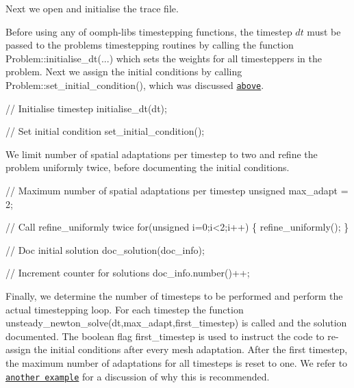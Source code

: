 Next we open and initialise the trace file.




Before using any of {\ttfamily oomph-\/lib\textquotesingle{}s} timestepping functions, the timestep $ dt $ must be passed to the problem\textquotesingle{}s timestepping routines by calling the function {\ttfamily Problem\+::initialise\+\_\+dt}(...) which sets the weights for all timesteppers in the problem. Next we assign the initial conditions by calling {\ttfamily Problem\+::set\+\_\+initial\+\_\+condition()}, which was discussed \href{#set_initial_condition}{\tt above}.


\begin{DoxyCodeInclude}
 \textcolor{comment}{// Initialise timestep}
 initialise\_dt(dt);

 \textcolor{comment}{// Set initial condition}
 set\_initial\_condition();

\end{DoxyCodeInclude}


We limit number of spatial adaptations per timestep to two and refine the problem uniformly twice, before documenting the initial conditions.


\begin{DoxyCodeInclude}
 \textcolor{comment}{// Maximum number of spatial adaptations per timestep}
 \textcolor{keywordtype}{unsigned} max\_adapt = 2;

 \textcolor{comment}{// Call refine\_uniformly twice}
 \textcolor{keywordflow}{for}(\textcolor{keywordtype}{unsigned} i=0;i<2;i++) \{ refine\_uniformly(); \}

 \textcolor{comment}{// Doc initial solution}
 doc\_solution(doc\_info);

 \textcolor{comment}{// Increment counter for solutions}
 doc\_info.number()++;

\end{DoxyCodeInclude}


Finally, we determine the number of timesteps to be performed and perform the actual timestepping loop. For each timestep the function {\ttfamily unsteady\+\_\+newton\+\_\+solve(dt,max\+\_\+adapt,first\+\_\+timestep)} is called and the solution documented. The boolean flag {\ttfamily first\+\_\+timestep} is used to instruct the code to re-\/assign the initial conditions after every mesh adaptation. After the first timestep, the maximum number of adaptations for all timesteps is reset to one. We refer to \href{../../../unsteady_heat/two_d_unsteady_heat_adapt/html/index.html#spatial_adapt}{\tt another example} for a discussion of why this is recommended.


